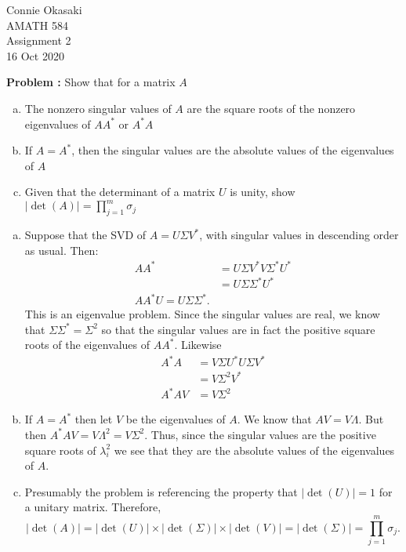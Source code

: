 \documentclass[letter, 12pt]{article}
\begin{document}
\parindent=0in
\newenvironment{problem}[1][]
   {\begin{framed} \textbf{Problem \theprobnum: #1}}
   {\end{framed}\stepcounter{probnum}}
\newenvironment{bookproblem}[1]
   {\begin{framed} \textbf{Problem #1:}}
   {\end{framed}\stepcounter{probnum}}

\begin{flushright}
Connie Okasaki \\
AMATH 584\\
Assignment 2\\
16 Oct 2020
\end{flushright}

\begin{problem}
Show that for a matrix $A$
\begin{enumerate}[(a)]
\item The nonzero singular values of $A$ are the square roots of the nonzero eigenvalues of $AA^*$ or $A^*A$
\item If $A=A^*$, then the singular values are the absolute values of the eigenvalues of $A$
\item Given that the determinant of a matrix $U$ is unity, show $|\det(A)|=\prod_{j=1}^m \sigma_j$
\end{enumerate}
\end{problem}

\begin{enumerate}[(a)]
\item Suppose that the SVD of $A = U\Sigma V^*$, with singular values in descending order as usual. Then:
\begin{align*}
AA^* & = U\Sigma V^* V \Sigma^* U^* \\
& = U\Sigma\Sigma^* U^* \\
AA^* U = U \Sigma\Sigma^*.
\end{align*}
This is an eigenvalue problem. Since the singular values are real, we know that $\Sigma\Sigma^* = \Sigma^2$ so that the singular values are in fact the positive square roots of the eigenvalues of $AA^*$. Likewise
\begin{align*}
A^*A & = V\Sigma U^*U\Sigma V^* \\
& = V\Sigma^2V^* \\
A^*A V & = V\Sigma^2
\end{align*}
\item If $A=A^*$ then let $V$ be the eigenvalues of $A$. We know that $AV = V \Lambda$. But then $A^*AV = V \Lambda^2 = V\Sigma^2$. Thus, since the singular values are the positive square roots of $\lambda_i^2$ we see that they are the absolute values of the eigenvalues of $A$.
\item Presumably the problem is referencing the property that $|\det(U)| = 1$ for a unitary matrix. Therefore, \[|\det(A)| = |\det(U)|\times |\det(\Sigma)| \times |\det(V)| = |\det(\Sigma)| = \prod_{j=1}^m \sigma_j.\]
\end{enumerate}

\pagebreak
\end{document}

